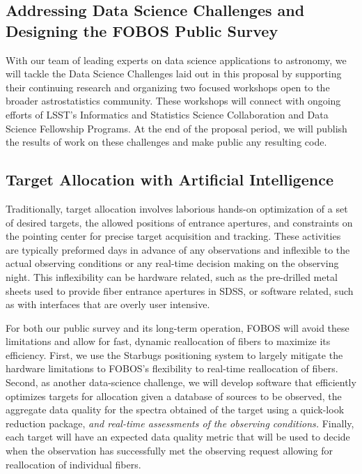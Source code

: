 \documentclass[oneside,11pt]{amsart}
\newcommand{\comment}[2][todo]{{\color{#1}[[{\bf #2}]]}}
\begin{document}
\subsection{Addressing Data Science Challenges and Designing the FOBOS Public Survey}
\label{sec:survey}
\noindent \comment{1 page}

With our team of leading experts on data science applications to astronomy, we will tackle the Data Science Challenges
laid out in this proposal by supporting their continuing research and organizing two focused workshops open to the
broader astrostatistics community.  These workshops will connect with ongoing efforts of LSST's Informatics and
Statistics Science Collaboration and Data Science Fellowship Programs.  At the end of the proposal period, we will publish the results of work on these challenges and make public any resulting code.





\subsection{Target Allocation with Artificial Intelligence}
\label{sec:targeting}
\noindent \comment{1/2 page}

Traditionally, target allocation involves laborious hands-on
optimization of a set of desired targets, the allowed positions of
entrance apertures, and constraints on the pointing center for precise
target acquisition and tracking.  These activities are typically
preformed days in advance of any observations and inflexible to the
actual observing conditions or any real-time decision making on the
observing night.  This inflexibility can be hardware related, such as
the pre-drilled metal sheets used to provide fiber entrance apertures in
SDSS, or software related, such as with interfaces that are overly user
intensive.

For both our public survey and its long-term operation, FOBOS will avoid
these limitations and allow for fast, dynamic reallocation of fibers to
maximize its efficiency.  First, we use the Starbugs positioning system
to largely mitigate the hardware limitations to FOBOS's flexibility to
real-time reallocation of fibers.  Second, as another data-science
challenge, we will develop software that efficiently optimizes targets
for allocation given a database of sources to be observed, the aggregate
data quality for the spectra obtained of the target using a quick-look
reduction package, {\it and real-time assessments of the observing
conditions.}  Finally, each target will have an expected data quality
metric that will be used to decide when the observation has successfully
met the observing request allowing for reallocation of individual
fibers.
\end{document}
